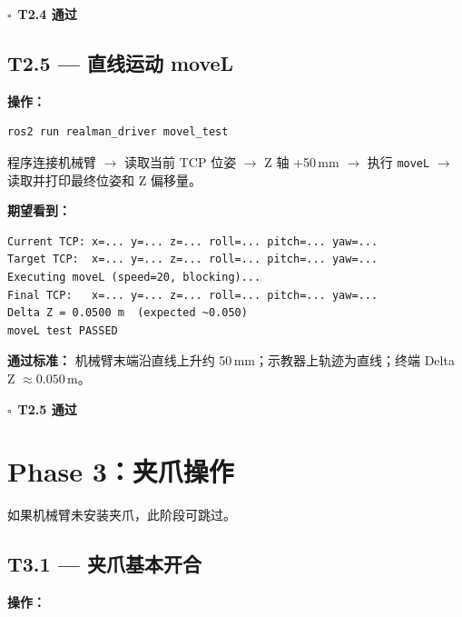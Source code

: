 \documentclass[12pt,a4paper,fontset=ubuntu]{ctexart}
\newcommand{\chkbox}{$\square$}
\newcommand{\passcriteria}[1]{%
  \textbf{通过标准：} #1%
}
\begin{document}
\begin{center}\chkbox\ \textbf{T2.4 通过}\end{center}


\subsection{T2.5 — 直线运动 moveL}

\textbf{操作：}

\begin{lstlisting}[language=bash]
ros2 run realman_driver movel_test
\end{lstlisting}

\begin{infobox}
程序连接机械臂 $\rightarrow$ 读取当前 TCP 位姿
$\rightarrow$ Z 轴 +50\,mm $\rightarrow$ 执行 \texttt{moveL}
$\rightarrow$ 读取并打印最终位姿和 Z 偏移量。
\end{infobox}

\textbf{期望看到：}

\begin{lstlisting}[]
Current TCP: x=... y=... z=... roll=... pitch=... yaw=...
Target TCP:  x=... y=... z=... roll=... pitch=... yaw=...
Executing moveL (speed=20, blocking)...
Final TCP:   x=... y=... z=... roll=... pitch=... yaw=...
Delta Z = 0.0500 m  (expected ~0.050)
moveL test PASSED
\end{lstlisting}

\passcriteria{
  机械臂末端沿直线上升约 50\,mm；示教器上轨迹为直线；终端 Delta Z $\approx 0.050\,\text{m}$。
}

\begin{center}\chkbox\ \textbf{T2.5 通过}\end{center}

\section{Phase 3：夹爪操作}

\begin{warnbox}
如果机械臂未安装夹爪，此阶段可跳过。
\end{warnbox}

\subsection{T3.1 — 夹爪基本开合}

\textbf{操作：}
\end{document}
